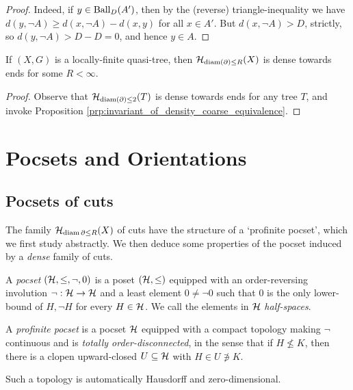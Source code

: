 \documentclass{amsart}
\begin{document}
\begin{proof}
        Indeed, if $y\in\operatorname{Ball}_D(A')$, then by the (reverse) triangle-inequality we have $d(y,\lnot A)\geq d(x,\lnot A)-d(x,y)$ for all $x\in A'$. But $d(x,\lnot A)>D$, strictly, so $d(y,\lnot A)>D-D=0$, and hence $y\in A$.
    \end{proof}

    \begin{corollary}
        If $(X,G)$ is a locally-finite quasi-tree, then $\mathcal{H}_{\operatorname{diam}(\partial)\leq R}(X)$ is dense towards ends for some $R<\infty$.
    \end{corollary}
    \begin{proof}
        Observe that $\mathcal{H}_{\operatorname{diam}(\partial)\leq2}(T)$ is dense towards ends for any tree $T$, and invoke Proposition \ref{prp:invariant_of_density_coarse_equivalence}.
    \end{proof}

    \section{Pocsets and Orientations}

    \subsection{Pocsets of cuts}\label{sec:pocsets_of_cuts}

    The family $\mathcal{H}_{\operatorname{diam}\partial\leq R}(X)$ of cuts have the structure of a `profinite pocset', which we first study abstractly. We then deduce some properties of the pocset induced by a \textit{dense} family of cuts.

    \begin{definition}\label{def:profinite_pocset}
        A \textit{pocset} $(\mathcal{H},\leq,\lnot,0)$ is a poset $(\mathcal{H},\leq)$ equipped with an order-reversing involution $\lnot:\mathcal{H}\to\mathcal{H}$ and a least element $0\neq\lnot0$ such that $0$ is the only lower-bound of $H,\lnot H$ for every $H\in\mathcal{H}$. We call the elements in $\mathcal{H}$ \textit{half-spaces}.

        A \textit{profinite pocset} is a pocset $\mathcal{H}$ equipped with a compact topology making $\lnot$ continuous and is \textit{totally order-disconnected}, in the sense that if $H\not\leq K$, then there is a clopen upward-closed $U\subseteq\mathcal{H}$ with $H\in U\not\ni K$.
    \end{definition}

    \begin{remark}
        Such a topology is automatically Hausdorff and zero-dimensional.
    \end{remark}
\end{document}
